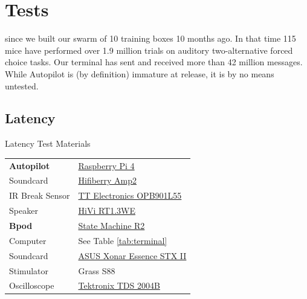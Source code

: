 \documentclass[nohyper, justified, notitlepage, marginals=raggedright,twoside=false,debug]{tufte-autopilot}
\begin{document}
\chapter{Tests}
\label{sec:tests}

 since we built our swarm of 10 training boxes 10 months ago. In that time 115 mice have performed over 1.9 million trials on auditory two-alternative forced choice tasks. Our terminal has sent and received more than 42 million messages. While Autopilot is (by definition) immature at release, it is by no means untested.

\section{Latency}
\label{sec:latency}

\begin{margintable}[1.5cm]
\caption{Latency Test Materials}
\label{tab:materials}
\noindent\begin{tabularx}{\linewidth}{lX}%
\toprule
\textbf{Autopilot} & \href{https://www.raspberrypi.org/products/raspberry-pi-4-model-b/}{Raspberry Pi 4}\\
Soundcard & \href{https://www.hifiberry.com/shop/boards/hifiberry-amp2/}{Hifiberry Amp2} \\
IR Break Sensor & \href{https://www.digikey.com/product-detail/en/tt-electronics-optek-technology/OPB901L55/365-1767-ND/1637490}{TT Electronics OPB901L55}\\
Speaker & \href{https://www.parts-express.com/hivi-rt13we-isodynamic-tweeter--297-421}{HiVi RT1.3WE}\\
\midrule
\textbf{Bpod} & \href{https://sanworks.io/shop/viewproduct?productID=1024}{State Machine R2}\\
Computer & See Table \ref{tab:terminal}\\
Soundcard & \href{https://www.asus.com/Sound-Cards/Essence_STX_II_71/}{ASUS Xonar Essence STX II}\\
Stimulator & Grass S88 \\
\midrule
Oscilloscope & \href{https://download.tek.com/manual/071181702web.pdf}{Tektronix TDS 2004B}\\
\bottomrule
\end{tabularx}
\end{margintable}
\end{document}
